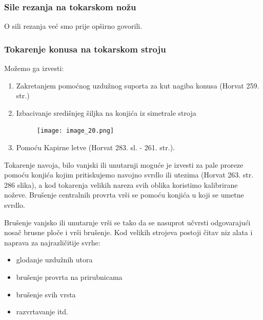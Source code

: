 \documentclass[a4paper,12pt]{article}
\numberwithin{figure}{section}
\begin{document}
\subsubsection{Sile rezanja na tokarskom nožu}
O sili rezanja već smo prije opširno govorili.
\subsubsection{Tokarenje konusa na tokarskom stroju}
Možemo ga izvesti:
\begin{enumerate}
\item Zakretanjem pomoćnog uzdužnog suporta za kut nagiba konusa (Horvat 259. str.)
\item Izbacivanje središnjeg šiljka na konjića iz simetrale stroja
\begin{figure}[!h]
\centering
\texttt{[image: image\_20.png]}
\end{figure}
\FloatBarrier
\item Pomoću Kapirne letve (Horvat 283. sl. - 261. str.).
\end{enumerate}
Tokarenje navoja, bilo vanjski ili unutarnji moguće je izvesti za pale proreze pomoću konjića kojim pritiskujemo navojno svrdlo ili utezima (Horvat 263. str. 286 slika), a kod tokarenja velikih nareza svih oblika koristimo kalibrirane noževe. Brušenje centralnih provrta vrši se pomoću konjića u koji se umetne svrdlo.\par
Brušenje vanjsko ili unutarnje vrši se tako da se nasuprot učvrsti odgovarajući nosač brusne ploče i vrši brušenje. Kod velikih strojeva postoji čitav niz alata i naprava za najrazličitije svrhe:
\begin{itemize}
\item glodanje uzdužnih utora
\item brušenje provrta na prirubnicama
\item brušenje svih vrsta
\item razvrtavanje itd.
\end{itemize}
\end{document}
